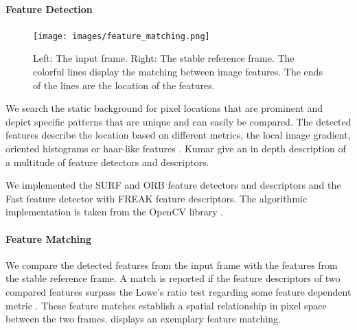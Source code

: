 \paragraph{Feature Detection}
\begin{figure}[t]
   \begin{center}
      \texttt{[image: images/feature\_matching.png]}
   \end{center}
   \caption{
      Left: The input frame. 
      Right: The stable reference frame.
      The colorful lines display the matching between image features. 
      The ends of the lines are the location of the features.
       }
   \label{fig:dynamic_stabilization_feature_matching}
\end{figure}

We search the static background for pixel locations that are prominent and depict specific patterns that are unique and can easily be compared.
The detected features describe the location based on different metrics, \eg{} the local image gradient, oriented histograms or haar-like features \cite{stork2001pattern}.
Kumar \etal{} \cite{kumar2014survey} give an in depth description of a multitude of feature detectors and descriptors.

We implemented the SURF \cite{bay10.1007/11744023_32} and ORB \cite{rublee6126544} feature detectors and descriptors and the Fast \cite{Ghahremani_2021} feature detector with FREAK \cite{alahi6247715} feature descriptors. The algorithmic implementation is taken from the OpenCV library \cite{opencv_library}. 


\paragraph{Feature Matching}
We compare the detected features from the input frame with the features from the stable reference frame.
A match is reported if the feature descriptors of two compared features surpass the Lowe's ratio test \cite{lowe10.1023/B:VISI.0000029664.99615.94} regarding some feature dependent metric \cite{kumar2014survey}.
These feature matches establish a spatial relationship in pixel space between the two frames.
 displays an exemplary feature matching.

